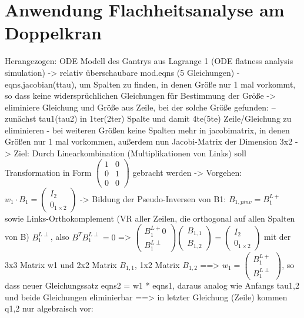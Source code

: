 \section{Anwendung Flachheitsanalyse am Doppelkran}
Herangezogen: ODE Modell des Gantrys aus Lagrange 1 (ODE flatness analysis simulation)
-> relativ überschaubare mod.eqns (5 Gleichungen)
- eqns.jacobian(ttau), um Spalten zu finden, in denen Größe nur 1 mal vorkommt, so dass keine widersprüchlichen Gleichungen für Bestimmung der Größe 
-> eliminiere Gleichung und Größe aus Zeile, bei der solche Größe gefunden:
-- zunächst tau1(tau2) in 1ter(2ter) Spalte und damit 4te(5te) Zeile/Gleichung zu eliminieren
- bei weiteren Größen keine Spalten mehr in jacobimatrix, in denen Größen nur 1 mal vorkommen, außerdem nun Jacobi-Matrix der Dimension 3x2 
-> Ziel: Durch Linearkombination (Multiplikationen von Links) soll Transformation in Form $\left(\begin{matrix}
1 & 0\\
0 & 1\\
0 & 0
\end{matrix}\right)$ gebracht werden
-> Vorgehen: $w_1 \cdot B_1 = \left(\begin{matrix}
I_2 \\
0_{1 \times 2}
\end{matrix}\right)$ 
-> Bildung der Pseudo-Inversen von B1: $B_{1, pinv} = B_1^{L+}$ sowie Links-Orthokomplement (VR aller Zeilen, die orthogonal auf allen Spalten von B) $B_1^{L \perp}$, also $B^T B_1^{L \perp} = 0$
=> $\left(\begin{matrix}
B_1^{L+} 0 \\
B_1^{L \perp}
\end{matrix}\right)
\left(\begin{matrix}
B_{1, 1} \\
B_{1,2}
\end{matrix}\right)
=
\left(\begin{matrix}
I_2 \\
0_{1 \times 2}
\end{matrix}\right)
$
mit der 3x3 Matrix w1 und 2x2 Matrix $B_{1,1}$, 1x2 Matrix $B_{1,2}$
==> $w_1 = \left(\begin{matrix}
B_1^{L+} \\
B_1^{L\perp}
\end{matrix} \right)$, so dass neuer Gleichungssatz eqns2 = w1 * eqns1, daraus analog wie Anfangs tau1,2 und beide Gleichungen eliminierbar
==> in letzter Gleichung (Zeile) kommen q1,2 nur algebraisch vor:
